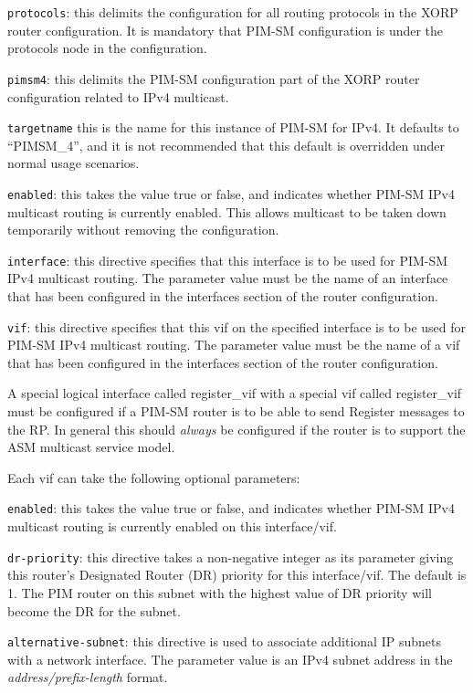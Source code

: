 \begin{description}
\item{\tt protocols}: this delimits the configuration for all routing
  protocols in the XORP router configuration.  It is mandatory that
  PIM-SM configuration is under the {\stt protocols} node in the
  configuration.
\item{\tt pimsm4}: this delimits the PIM-SM configuration part of the XORP
  router configuration related to IPv4 multicast.
\item{\tt targetname} this is the name for this instance of PIM-SM for
  IPv4.  It defaults to ``{\stt PIMSM\_4}'', and it is not recommended
  that this default is overridden under normal usage scenarios.
\item{\tt enabled}: this takes the value {\stt true} or {\stt false},
  and indicates whether PIM-SM IPv4 multicast routing is currently
  enabled.  This allows multicast to be taken down temporarily without
  removing the configuration.
\item{\tt interface}: this directive specifies that this {\stt
  interface} is to be used for PIM-SM IPv4 multicast routing.  The
  parameter value must be the name of an interface that has been
  configured in the {\stt interfaces} section of the router
  configuration.
\item{\tt vif}: this directive specifies that this {\stt vif}
  on the specified {\stt interface} is to be used for PIM-SM IPv4
  multicast routing.  The parameter value must be the name of a vif
  that has been configured in the {\stt interfaces} section of the
  router configuration.

  A special logical interface called {\stt register\_vif} with a
  special vif called {\stt register\_vif} must be configured if a
  PIM-SM router is to be able to send Register messages to the RP.  In
  general this should {\it always} be configured if the router is to
  support the ASM multicast service model.

  Each {\stt vif} can take the following optional parameters:
\begin{description}
\item{\tt enabled}: this takes the value {\stt true} or {\stt false},
  and indicates whether PIM-SM IPv4 multicast routing is currently
  enabled on this interface/vif.
\item{\tt dr-priority}: this directive takes a non-negative integer as
  its parameter giving this router's Designated Router (DR) priority
  for this interface/vif.  The default is 1.  The PIM router on this
  subnet with the highest value of DR priority will become the DR for
  the subnet.
\item{\tt alternative-subnet}: this directive is used to associate
  additional IP subnets with a network interface. The parameter value
  is an IPv4 subnet address in the {\it address/prefix-length} format.


\end{description}
\end{description}
